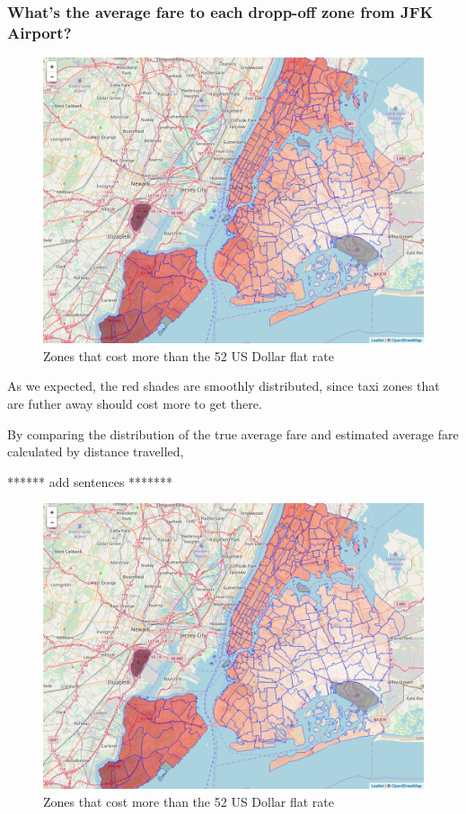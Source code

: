 \documentclass[12pt,twoside]{reedthesis}
\theoremstyle{definition}
\theoremstyle{definition}
\theoremstyle{definition}
\theoremstyle{remark}
\begin{document}
\subsubsection{What's the average fare to each dropp-off zone from JFK
Airport?}\label{whats-the-average-fare-to-each-dropp-off-zone-from-jfk-airport}
\begin{figure}

{\centering \includegraphics[width=4.96in]{figure/from_jkf_fare_vis} 

}

\caption{Zones that cost more than the 52 US Dollar flat rate}\label{fig:from-jkf-fare-vis}
\end{figure}
As we expected, the red shades are smoothly distributed, since taxi
zones that are futher away should cost more to get there.

By comparing the distribution of the true average fare and estimated
average fare calculated by distance travelled,

****** add sentences *******
\begin{figure}

{\centering \includegraphics[width=4.96in]{figure/from_jkf_fare_est} 

}

\caption{Zones that cost more than the 52 US Dollar flat rate}\label{fig:from-jkf-fare-est}
\end{figure}
\end{document}
